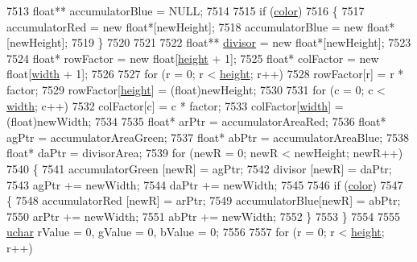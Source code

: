 \begin{DoxyCode}
7513   \textcolor{keywordtype}{float}** accumulatorBlue  = NULL;
7514 
7515   \textcolor{keywordflow}{if}  (\hyperlink{class_k_k_b_1_1_raster_a482384d89cc53fa4f36276307c746854}{color})
7516   \{
7517     accumulatorRed  = \textcolor{keyword}{new} \textcolor{keywordtype}{float}*[newHeight];
7518     accumulatorBlue = \textcolor{keyword}{new} \textcolor{keywordtype}{float}*[newHeight];
7519   \}
7520 
7521 
7522   \textcolor{keywordtype}{float}** \hyperlink{class_k_k_b_1_1_raster_afaaaf54fd824a4a47fba97f7fba9398f}{divisor}   = \textcolor{keyword}{new} \textcolor{keywordtype}{float}*[newHeight];
7523 
7524   \textcolor{keywordtype}{float}*  rowFactor = \textcolor{keyword}{new} \textcolor{keywordtype}{float}[\hyperlink{class_k_k_b_1_1_raster_af39ff189de4fbb6de98392e187efafb7}{height} + 1];
7525   \textcolor{keywordtype}{float}*  colFactor = \textcolor{keyword}{new} \textcolor{keywordtype}{float}[\hyperlink{class_k_k_b_1_1_raster_ae0bcc103e191c3421d7692dc69ceb554}{width}  + 1];
7526 
7527   \textcolor{keywordflow}{for}  (r = 0;  r < \hyperlink{class_k_k_b_1_1_raster_af39ff189de4fbb6de98392e187efafb7}{height};  r++)
7528     rowFactor[r] = r * factor;
7529   rowFactor[\hyperlink{class_k_k_b_1_1_raster_af39ff189de4fbb6de98392e187efafb7}{height}] = (float)newHeight;
7530 
7531   \textcolor{keywordflow}{for}  (c = 0;  c < \hyperlink{class_k_k_b_1_1_raster_ae0bcc103e191c3421d7692dc69ceb554}{width};  c++)
7532     colFactor[c] = c * factor;
7533   colFactor[\hyperlink{class_k_k_b_1_1_raster_ae0bcc103e191c3421d7692dc69ceb554}{width}] = (float)newWidth;
7534 
7535   \textcolor{keywordtype}{float}*  arPtr = accumulatorAreaRed;
7536   \textcolor{keywordtype}{float}*  agPtr = accumulatorAreaGreen;
7537   \textcolor{keywordtype}{float}*  abPtr = accumulatorAreaBlue;
7538   \textcolor{keywordtype}{float}*  daPtr = divisorArea;
7539   \textcolor{keywordflow}{for}  (newR = 0;  newR < newHeight;  newR++)
7540   \{
7541     accumulatorGreen [newR] = agPtr;
7542     divisor          [newR] = daPtr;
7543     agPtr += newWidth;
7544     daPtr += newWidth;
7545 
7546     \textcolor{keywordflow}{if}  (\hyperlink{class_k_k_b_1_1_raster_a482384d89cc53fa4f36276307c746854}{color})
7547     \{
7548       accumulatorRed [newR] = arPtr;
7549       accumulatorBlue[newR] = abPtr;
7550       arPtr += newWidth;
7551       abPtr += newWidth;
7552     \}
7553   \}
7554 
7555   \hyperlink{namespace_k_k_b_ace9969169bf514f9ee6185186949cdf7}{uchar}  rValue = 0, gValue = 0, bValue = 0;
7556 
7557   \textcolor{keywordflow}{for}  (r = 0;  r < \hyperlink{class_k_k_b_1_1_raster_af39ff189de4fbb6de98392e187efafb7}{height};  r++)

\end{DoxyCode}
